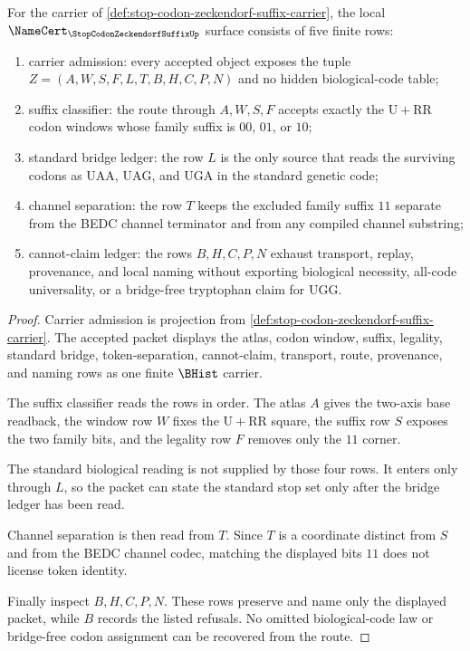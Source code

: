 \begin{theorem}
\label{thm:stop-codon-zeckendorf-suffix-namecert-obligations}
For the carrier of \autoref{def:stop-codon-zeckendorf-suffix-carrier}, the local $\NameCert_{\StopCodonZeckendorfSuffixUp}$ surface consists of five finite rows:
\begin{enumerate}
\item carrier admission: every accepted object exposes the tuple $Z=(A,W,S,F,L,T,B,H,C,P,N)$ and no hidden biological-code table;
\item suffix classifier: the route through $A,W,S,F$ accepts exactly the $\mathrm{U}+\mathrm{RR}$ codon windows whose family suffix is $00$, $01$, or $10$;
\item standard bridge ledger: the row $L$ is the only source that reads the surviving codons as $\mathrm{UAA}$, $\mathrm{UAG}$, and $\mathrm{UGA}$ in the standard genetic code;
\item channel separation: the row $T$ keeps the excluded family suffix $11$ separate from the BEDC channel terminator and from any compiled channel substring;
\item cannot-claim ledger: the rows $B,H,C,P,N$ exhaust transport, replay, provenance, and local naming without exporting biological necessity, all-code universality, or a bridge-free tryptophan claim for $\mathrm{UGG}$.
\end{enumerate}
\end{theorem}
\begin{proof}
Carrier admission is projection from \autoref{def:stop-codon-zeckendorf-suffix-carrier}. The accepted packet displays the atlas, codon window, suffix, legality, standard bridge, token-separation, cannot-claim, transport, route, provenance, and naming rows as one finite $\BHist$ carrier.

The suffix classifier reads the rows in order. The atlas $A$ gives the two-axis base readback, the window row $W$ fixes the $\mathrm{U}+\mathrm{RR}$ square, the suffix row $S$ exposes the two family bits, and the legality row $F$ removes only the $11$ corner.

The standard biological reading is not supplied by those four rows. It enters only through $L$, so the packet can state the standard stop set only after the bridge ledger has been read.

Channel separation is then read from $T$. Since $T$ is a coordinate distinct from $S$ and from the BEDC channel codec, matching the displayed bits $11$ does not license token identity.

Finally inspect $B,H,C,P,N$. These rows preserve and name only the displayed packet, while $B$ records the listed refusals. No omitted biological-code law or bridge-free codon assignment can be recovered from the route.
\end{proof}

